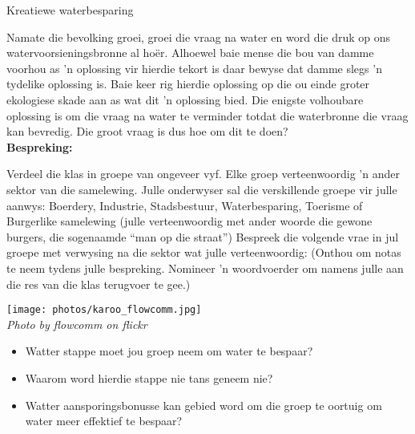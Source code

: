             \begin{groupdiscussion}{ Kreatiewe waterbesparing
}
            \nopagebreak

\label{m38138*uid289435}Namate die bevolking groei, groei die vraag na water en word die druk op ons watervoorsieningsbronne al hoër. Alhoewel baie mense die bou van damme voorhou as  'n oplossing vir hierdie tekort is daar bewyse dat damme slegs  'n tydelike oplossing is. Baie keer rig hierdie oplossing op die ou einde groter ekologiese skade aan as wat dit  'n oplossing bied. Die enigste volhoubare oplossing is om die vraag na water te verminder totdat die waterbronne die vraag kan bevredig. Die groot vraag is dus hoe om dit te doen?\\
\label{m38138*uid5630}\textbf{Bespreking:}
\begin{minipage}{.6\textwidth}
 Verdeel die klas in groepe van ongeveer vyf. Elke groep verteenwoordig  'n ander sektor van die samelewing. Julle onderwyser sal die verskillende groepe vir julle aanwys: Boerdery, Industrie, Stadsbestuur, Waterbesparing, Toerisme of Burgerlike samelewing (julle verteenwoordig met ander woorde die gewone burgers, die sogenaamde “man op die straat”) Bespreek die volgende vrae in jul groepe met verwysing na die sektor wat julle verteenwoordig: (Onthou om notas te neem tydens julle bespreking. Nomineer  'n woordvoerder om namens julle aan die res van die klas terugvoer te gee.)
\end{minipage}
\begin{minipage}{.4\textwidth}
 \begin{center}
  \texttt{[image: photos/karoo\_flowcomm.jpg]} \\
\textsl{Photo by flowcomm on flickr}
 \end{center}

\end{minipage}
\label{m38138*id342317}\begin{itemize}[noitemsep]
            \label{m38138*uid88}\item Watter stappe moet jou groep neem om water te bespaar?
\label{m38138*uid89}\item Waarom word hierdie stappe nie tans geneem nie?
\label{m38138*uid90}\item Watter aansporingsbonusse kan gebied word om die groep te oortuig om water meer effektief te bespaar?
\end{itemize}


\end{groupdiscussion}
\par 
